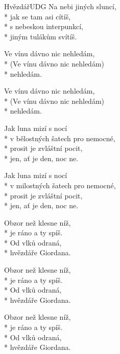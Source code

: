 \documentclass[10.5pt]{book}
\begin{document}
\begin{poem}{Hvězdář}{UDG}
Na nebi jiných sluncí, \\*
jak se tam asi cítíš,\\*
s nebeskou interpunkcí, \\*
jiným tulákům svítíš.

\begin{altverse}
Ve vínu dávno nic nehledám, \\*
(Ve vínu dávno nic nehledám) \\*
nehledám.
\end{altverse}
\begin{altverse}
Ve vínu dávno nic nehledám, \\*
(Ve vínu dávno nic nehledám) \\*
nehledám.
\end{altverse}

Jak luna mizí s nocí\\*
v bělostných šatech pro nemocné,\\*
prosit je zvláštní pocit,\\*
jen, ať je den, noc ne.

Jak luna mizí s nocí\\*
v milostných šatech pro nemocné,\\*
prosit je zvláštní pocit,\\*
jen, ať je den, noc ne.

Obzor než klesne níž, \\*
je ráno a ty spíš.\\*
Od vlků odraná, \\*
hvězdáře Giordana.

Obzor než klesne níž, \\*
je ráno a ty spíš.\\*
Od vlků odraná, \\*
hvězdáře Giordana.

Obzor než klesne níž, \\*
je ráno a ty spíš.\\*
Od vlků odraná, \\*
hvězdáře Giordana.
\end{poem}
\end{document}
